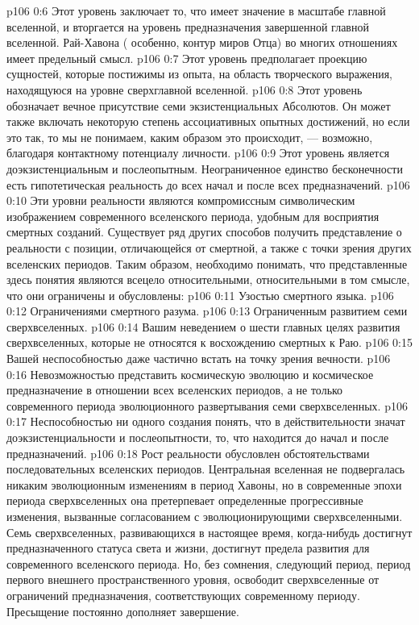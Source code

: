 \vs p106 0:6 \bibnobreakspace {} Этот уровень заключает то, что имеет значение в масштабе главной вселенной, и вторгается на уровень предназначения завершенной главной вселенной. Рай\hyp{}Хавона ( особенно, контур миров Отца) во многих отношениях имеет предельный смысл.
\vs p106 0:7 \bibnobreakspace {} Этот уровень предполагает проекцию сущностей, которые постижимы из опыта, на область творческого выражения, находящуюся на уровне сверхглавной вселенной.
\vs p106 0:8 \bibnobreakspace {} Этот уровень обозначает вечное присутствие семи экзистенциальных Абсолютов. Он может также включать некоторую степень ассоциативных опытных достижений, но если это так, то мы не понимаем, каким образом это происходит, --- возможно, благодаря контактному потенциалу личности.
\vs p106 0:9 \bibnobreakspace {} Этот уровень является доэкзистенциальным и послеопытным. Неограниченное единство бесконечности есть гипотетическая реальность до всех начал и после всех предназначений.
\vs p106 0:10 \pc Эти уровни реальности являются компромиссным символическим изображением современного вселенского периода, удобным для восприятия смертных созданий. Существует ряд других способов получить представление о реальности с позиции, отличающейся от смертной, а также с точки зрения других вселенских периодов. Таким образом, необходимо понимать, что представленные здесь понятия являются всецело относительными, относительными в том смысле, что они ограничены и обусловлены:
\vs p106 0:11 \bibnobreakspace Узостью смертного языка.
\vs p106 0:12 \bibnobreakspace Ограничениями смертного разума.
\vs p106 0:13 \bibnobreakspace Ограниченным развитием семи сверхвселенных.
\vs p106 0:14 \bibnobreakspace Вашим неведением о шести главных целях развития сверхвселенных, которые не относятся к восхождению смертных к Раю.
\vs p106 0:15 \bibnobreakspace Вашей неспособностью даже частично встать на точку зрения вечности.
\vs p106 0:16 \bibnobreakspace Невозможностью представить космическую эволюцию и космическое предназначение в отношении всех вселенских периодов, а не только современного периода эволюционного развертывания семи сверхвселенных.
\vs p106 0:17 \bibnobreakspace Неспособностью ни одного создания понять, что в действительности значат доэкзистенциальности и послеопытности, то, что находится до начал и после предназначений.
\vs p106 0:18 \pc Рост реальности обусловлен обстоятельствами последовательных вселенских периодов. Центральная вселенная не подвергалась никаким эволюционным изменениям в период Хавоны, но в современные эпохи периода сверхвселенных она претерпевает определенные прогрессивные изменения, вызванные согласованием с эволюционирующими сверхвселенными. Семь сверхвселенных, развивающихся в настоящее время, когда\hyp{}нибудь достигнут предназначенного статуса света и жизни, достигнут предела развития для современного вселенского периода. Но, без сомнения, следующий период, период первого внешнего пространственного уровня, освободит сверхвселенные от ограничений предназначения, соответствующих современному периоду. Пресыщение постоянно дополняет завершение.
